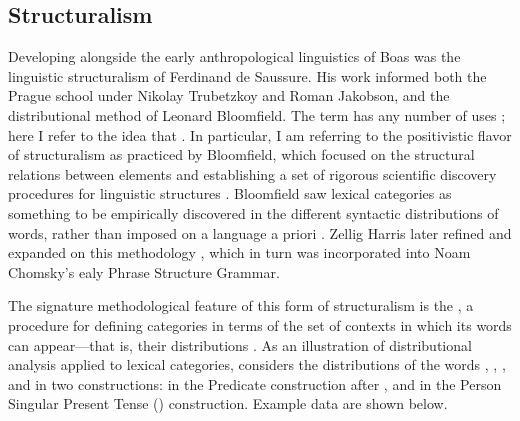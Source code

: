 \subsection{Structuralism}
\label{sec:2.2.3}

Developing alongside the early anthropological linguistics of Boas was the linguistic structuralism of Ferdinand de Saussure. His work informed both the Prague school under Nikolay Trubetzkoy and Roman Jakobson, and the distributional method of Leonard Bloomfield. The term  has any number of uses \parencite[Ch.~1]{Matthews2001}; here I refer to the idea that . In particular, I am referring to the positivistic flavor of structuralism as practiced by Bloomfield, which focused on the structural relations between elements and establishing a set of rigorous scientific discovery procedures for linguistic structures \parencite{Bloomfield1933}. Bloomfield saw lexical categories as something to be empirically discovered in the different syntactic distributions of words, rather than imposed on a language a priori \parencite[33]{Rauh2010}. Zellig Harris later refined and expanded on this methodology \parencite{Harris1951}, which in turn was incorporated into Noam Chomsky's ealy Phrase Structure Grammar.

The signature methodological feature of this form of structuralism is the , a procedure for defining categories in terms of the set of contexts in which its words can appear—that is, their distributions \parencites[5]{Harris1951}[11]{Croft2001}. As an illustration of distributional analysis applied to lexical categories, \textcite[11--12]{Croft1991} considers the distributions of the  words , , , and  in two constructions: in the Predicate construction after , and in the  Person Singular Present Tense () construction. Example data are shown below.

\begin{exe}
  \ex\label{ex:2.2}
    \begin{xlist}
      \setlength{\itemsep}{0em}
    \end{xlist}
  \ex\label{ex:2.3}
    \begin{xlist}
      \setlength{\itemsep}{0em}
    \end{xlist}
  \ex\label{ex:2.4}
    \begin{xlist}
      \setlength{\itemsep}{0em}
    \end{xlist}
  \ex\label{ex:2.5}
    \begin{xlist}
      \setlength{\itemsep}{0em}
    \end{xlist}
\end{exe}


